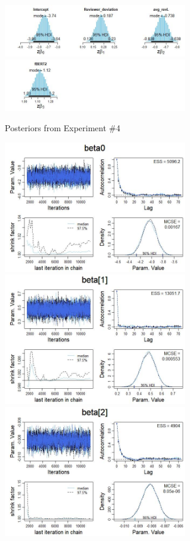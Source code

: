 \documentclass[man, floatsintext, 10pt]{apa6}
\begin{document}
\begin{figure}
\includegraphics[width=8cm]{posteriors_bdata_03.jpg}
\includegraphics[width=8cm]{pposteriors_bdata_03.jpg}
\caption{Posteriors from Experiment \#4}
  \label{Exp4}
\end{figure}

\begin{figure}
\includegraphics[width=8cm]{Intercept_exp4.jpg}
\includegraphics[width=8cm]{ReviewerDevExp4.jpg} \\
\includegraphics[width=8cm]{AvgRevLenExp4.jpg}

\end{figure}
\end{document}
